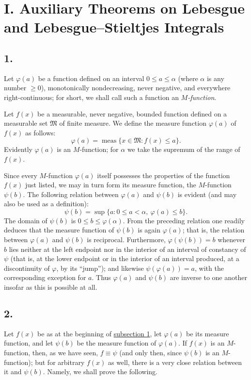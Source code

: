 \documentclass[12pt,b5paper,twoside]{article}
\begin{document}
\section*{I. Auxiliary Theorems on Lebesgue and Lebesgue--Stieltjes Integrals}
\label{sec:I}

\subsection*{1.}
\label{sec:I.1}
Let $\varphi(a)$ be a function defined on an interval $0\leq a\leq\alpha$ (where $\alpha$ is any number $\geq0$), monotonically nondecreasing, never negative, and everywhere right-continuous; for short, we shall call such a function an \emph{$M$-function}.

Let $f(x)$ be a measurable, never negative, bounded function defined on a measurable set $\mathfrak M$ of finite measure. We define the measure function $\varphi(a)$ of $f(x)$ as follows:
\[
  \varphi(a)=\operatorname{meas}\{x\in\mathfrak M:f(x)\leq a\}.
\]
Evidently $\varphi(a)$ is an $M$-function; for $\alpha$ we take the supremum of the range of $f(x)$.

Since every $M$-function $\varphi(a)$ itself possesses the properties of the function $f(x)$ just listed, we may in turn form its measure function, the $M$-function $\psi(b)$. The following relation between $\varphi(a)$ and $\psi(b)$ is evident (and may also be used as a definition):
\[
  \psi(b)=\sup\{a:0\leq a<\alpha,\ \varphi(a)\leq b\}.
\]
The domain of $\psi(b)$ is $0\leq b\leq\varphi(\alpha)$. From the preceding relation one readily deduces that the measure function of $\psi(b)$ is again $\varphi(a)$; that is, the relation between $\varphi(a)$ and $\psi(b)$ is reciprocal. Furthermore, $\varphi(\psi(b))=b$ whenever $b$ lies neither at the left endpoint nor in the interior of an interval of constancy of $\psi$ (that is, at the lower endpoint or in the interior of an interval produced, at a discontinuity of $\varphi$, by its ``jump''); and likewise $\psi(\varphi(a))=a$, with the corresponding exception for $a$. Thus $\varphi(a)$ and $\psi(b)$ are inverse to one another insofar as this is possible at all.

\subsection*{2.}
\label{sec:I.2}
Let $f(x)$ be as at the beginning of \hyperref[sec:I.1]{subsection 1}, let $\varphi(a)$ be its measure function, and let $\psi(b)$ be the measure function of $\varphi(a)$. If $f(x)$ is an $M$-function, then, as we have seen, $f\equiv\psi$ (and only then, since $\psi(b)$ is an $M$-function); but for arbitrary $f(x)$ as well, there is a very close relation between it and $\psi(b)$. Namely, we shall prove the following.
\end{document}
